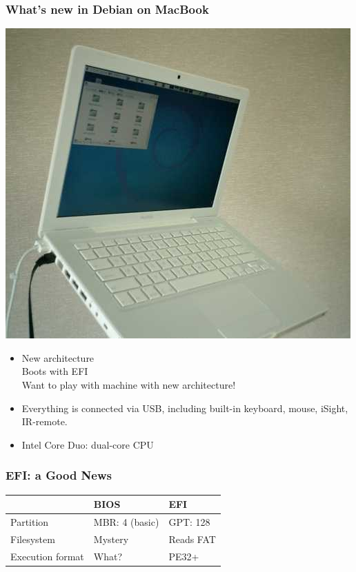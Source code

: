 \documentclass[cjk,dvipdfmx]{beamer}
\begin{document}
\begin{frame}
\frametitle{What's new in Debian on MacBook}
\begin{center}

\begin{minipage}[b]{0.3\hsize}
 \includegraphics[width=1\hsize]{image200607/macbook.png}
\end{minipage}
\begin{minipage}[b]{0.6\hsize}
  \begin{itemize}
   \item New architecture\\
	 Boots with EFI\\
	 Want to play with machine with new architecture!
   \item Everything is connected via USB, including built-in keyboard,
	mouse, iSight, IR-remote.
   \item Intel Core Duo: dual-core CPU
 \end{itemize}
\end{minipage}

\end{center}
\end{frame}

\begin{frame}
\frametitle{EFI: a Good News}

\begin{tabular}[t]{|p{8em}|p{8em}|p{8em}|}
\hline
 & BIOS & EFI \\
\hline
Partition & MBR: 4 (basic) & GPT: 128 \\
\hline
Filesystem & Mystery & Reads FAT \\
\hline
Execution format & What? & PE32+ \\
\hline
\end{tabular}
\end{frame}
\end{document}
